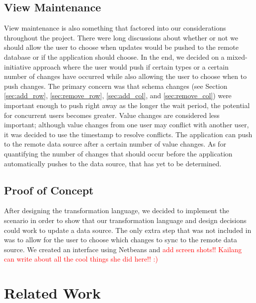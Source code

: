 \documentclass[12pt]{article}
\begin{document}
\subsection{View Maintenance}
View maintenance is also something that factored into our considerations throughout the project. There were long discussions about whether or not we should allow the user to choose when updates would be pushed to the remote database or if the application should choose. In the end, we decided on a mixed-initiative approach where the user would push if certain types or a certain number of changes have occurred while also allowing the user to choose when to push changes. The primary concern was that schema changes (see Section \ref{sec:add_row}, \ref{sec:remove_row}, \ref{sec:add_col}, and \ref{sec:remove_col}) were important enough to push right away as the longer the wait period, the potential for concurrent users becomes greater. Value changes are considered less important; although value changes from one user may conflict with another user, it was decided to use the timestamp to resolve conflicts. The application can push to the remote data source after a certain number of value changes. As for quantifying the number of changes that should occur before the application automatically pushes to the data source, that has yet to be determined.

\subsection{Proof of Concept}
After designing the transformation language, we decided to implement the scenario in order to show that our transformation language and design decisions could work to update a data source. The only extra step that was not included in \cite{arniThesis} was to allow for the user to choose which changes to sync to the remote data source. We created an interface using Netbeans and \textcolor{red}{add screen shots!! Kailang can write about all the cool things she did here!! :)}

\section{Related Work}
\end{document}
